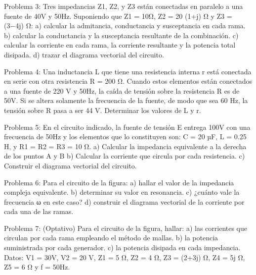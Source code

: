 Problema 3:
Tres impedancias Z1, Z2, y Z3  están conectadas en paralelo a una fuente de 40V y 50Hz. Suponiendo que  Z1 = 10Ω, Z2 = 20 (1+j) Ω y Z3 = (3−4j) Ω:
a)	calcular la admitancia, conductancia y susceptancia en cada rama.
b)	calcular la conductancia y la susceptancia resultante de la combinación.
c)	calcular la corriente en cada rama, la corriente resultante y la potencia total disipada.
d)	trazar el diagrama vectorial del circuito.



Problema 4:
Una inductancia L que tiene una resistencia interna r está conectada en serie con otra resistencia R = 200 Ω. Cuando estos elementos están conectados a una fuente de 220 V y 50Hz, la caída de tensión sobre la resistencia R es de 50V. Si se altera solamente la frecuencia de la fuente, de modo que sea 60 Hz, la tensión sobre R pasa a ser 44 V. Determinar los valores de L y r.



Problema 5:
En el circuito indicado, la fuente de tensión E entrega 100V con una frecuencia de 50Hz y los elementos que lo constituyen son:
C = 20 µF, L = 0.25 H, y R1 = R2 = R3 = 10 Ω.
a)	Calcular la impedancia equivalente a la derecha de los puntos A y B
b)	Calcular la corriente que circula por cada resistencia.
c)	Construir el diagrama vectorial del circuito.
 




Problema 6:
Para el circuito de la figura:
a)	hallar el valor de la impedancia compleja equivalente.
b)	determinar su valor en resonancia.
c)	¿cuánto vale la frecuencia ω en este caso?
d)	construir el diagrama vectorial de la corriente por cada una
de las ramas.



Problema 7: (Optativo)
Para el circuito de la figura, hallar:
a)	las	corrientes	que	circulan	por	cada	rama empleando el método de mallas.
b)	la potencia suministrada por cada generador.
c)	la potencia disipada en cada impedancia.
Datos: V1  = 30V, V2  = 20 V, Z1  = 5 Ω, Z2  = 4 Ω,  Z3  = (2+3j) Ω, Z4  = 5j Ω, Z5  = 6  Ω y f = 50Hz.

